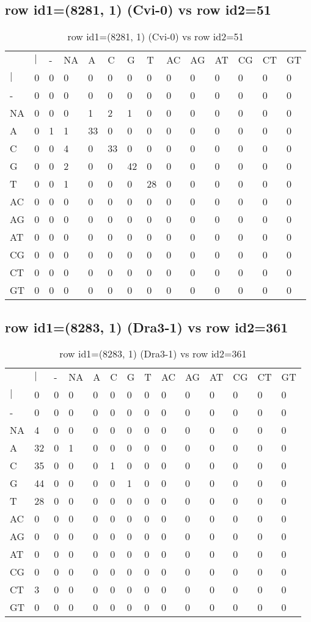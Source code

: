 \subsection{row id1=(8281, 1) (Cvi-0) vs row id2=51}
\begin{center}
\begin{longtable}{|l|l|l|l|l|l|l|l|l|l|l|l|l|l|}
\caption{row id1=(8281, 1) (Cvi-0) vs row id2=51} \label{table_dm244}\\
\hline
\\
\hline
&$|$&-&NA&A&C&G&T&AC&AG&AT&CG&CT&GT\\
$|$&0&0&0&0&0&0&0&0&0&0&0&0&0\\
-&0&0&0&0&0&0&0&0&0&0&0&0&0\\
NA&0&0&0&1&2&1&0&0&0&0&0&0&0\\
A&0&1&1&33&0&0&0&0&0&0&0&0&0\\
C&0&0&4&0&33&0&0&0&0&0&0&0&0\\
G&0&0&2&0&0&42&0&0&0&0&0&0&0\\
T&0&0&1&0&0&0&28&0&0&0&0&0&0\\
AC&0&0&0&0&0&0&0&0&0&0&0&0&0\\
AG&0&0&0&0&0&0&0&0&0&0&0&0&0\\
AT&0&0&0&0&0&0&0&0&0&0&0&0&0\\
CG&0&0&0&0&0&0&0&0&0&0&0&0&0\\
CT&0&0&0&0&0&0&0&0&0&0&0&0&0\\
GT&0&0&0&0&0&0&0&0&0&0&0&0&0\\
\hline
\end{longtable}
\end{center}

\subsection{row id1=(8283, 1) (Dra3-1) vs row id2=361}
\begin{center}
\begin{longtable}{|l|l|l|l|l|l|l|l|l|l|l|l|l|l|}
\caption{row id1=(8283, 1) (Dra3-1) vs row id2=361} \label{table_dm246}\\
\hline
\\
\hline
&$|$&-&NA&A&C&G&T&AC&AG&AT&CG&CT&GT\\
$|$&0&0&0&0&0&0&0&0&0&0&0&0&0\\
-&0&0&0&0&0&0&0&0&0&0&0&0&0\\
NA&4&0&0&0&0&0&0&0&0&0&0&0&0\\
A&32&0&1&0&0&0&0&0&0&0&0&0&0\\
C&35&0&0&0&1&0&0&0&0&0&0&0&0\\
G&44&0&0&0&0&1&0&0&0&0&0&0&0\\
T&28&0&0&0&0&0&0&0&0&0&0&0&0\\
AC&0&0&0&0&0&0&0&0&0&0&0&0&0\\
AG&0&0&0&0&0&0&0&0&0&0&0&0&0\\
AT&0&0&0&0&0&0&0&0&0&0&0&0&0\\
CG&0&0&0&0&0&0&0&0&0&0&0&0&0\\
CT&3&0&0&0&0&0&0&0&0&0&0&0&0\\
GT&0&0&0&0&0&0&0&0&0&0&0&0&0\\
\hline
\end{longtable}
\end{center}

